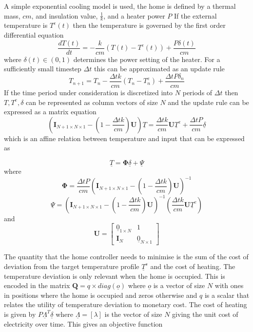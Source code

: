 \documentclass[a4paper, 10 pt, conference]{ieeeconf}  %
\begin{document}
A simple exponential cooling model is used, the home is defined by a thermal mass, $cm$, and insulation value, $\frac{1}{k}$, and a heater power $P$ If the external temperature is $T^{e}(t)$ then the temperature is governed by the first order differential equation
\begin{equation}
\frac{dT(t)}{dt} = -\frac{k}{cm}(T(t)-T^{e}(t)) +\frac{P\delta(t)}{cm}
\end{equation}
where $\delta(t) \in (0,1)$ determines the power setting of the heater. For a sufficiently small timestep $\Delta t$  this can be approximated as an update rule
\begin{equation}
T_{n+1} =  T_{n}-\frac{\Delta t k}{cm}(T_{n}-T_{n}^{e}) + \frac{\Delta t P \delta_{n}}{cm} 
\end{equation}
If the time period under consideration is discretized into $N$ periods of $\Delta t$ then $T, T^{e},\delta$ can be represented as column vectors of size $N$ and the update rule can be expressed as a matrix equation
\begin{equation}
\left( \mathbf{I}_{N+1 \times N \times 1}-(1-\frac{\Delta t k}{cm})\mathbf{U}\right) \underline{T} = \frac{\Delta t k}{cm}\mathbf{U}\underline{T}^{e}+\frac{\Delta t P}{cm}\underline{\delta}
\end{equation}
which is an affine relation between temperature and input that can be expressed as

\begin{equation}
\underline{T}=\mathbf{\Phi} \underline{\delta}+\underline{\Psi}
\end{equation}
where
\begin{equation}
\mathbf{\Phi}= \frac{\Delta t P}{cm} \left( \mathbf{I}_{N+1 \times N \times 1}-(1-\frac{\Delta t k}{cm})\mathbf{U}\right)^{-1}
\end{equation}
\begin{equation}
\underline{\Psi}= \left( \mathbf{I}_{N+1 \times N \times 1}-(1-\frac{\Delta t k}{cm})\mathbf{U}\right)^{-1} \left( \frac{\Delta t k}{cm}\mathbf{U}\underline{T}^{e}\right)
\end{equation}
and
\begin{equation}
\mathbf{U} = \left[
\begin{array}{c|c}
\underline{0}_{1\times N} & 1 \\ \hline
\mathbf{I}_{N} & \underline{0}_{N \times 1}
\end{array}\right]
\end{equation}

The quantity that the home controller needs to minimise is the sum of the cost of deviation from the target temperature profile $\underline{T}^s$ and the cost of heating. The temperature deviation is only relevant when the home is occupied. This is encoded in the matrix $\mathbf{Q}=q \times diag(\underline{o})$ where $\underline{o}$ is a vector of size $N$ with ones in positions where the home is occupied and zeros otherwise and $q$ is a scalar that relates the utility of temperature deviation to monetary cost. The cost of heating is given by $P\underline{\Lambda}^{T} \underline{\delta}$ where $\underline{\Lambda}=[ \lambda ]$ is the vector of size $N$ giving the unit cost of electricity over time. This gives an objective function
\end{document}
